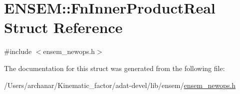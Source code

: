 \hypertarget{structENSEM_1_1FnInnerProductReal}{}\section{E\+N\+S\+EM\+:\+:Fn\+Inner\+Product\+Real Struct Reference}
\label{structENSEM_1_1FnInnerProductReal}


{\ttfamily \#include $<$ensem\+\_\+newops.\+h$>$}



The documentation for this struct was generated from the following file\+:\begin{DoxyCompactItemize}
\item 
/\+Users/archanar/\+Kinematic\+\_\+factor/adat-\/devel/lib/ensem/\mbox{\hyperlink{adat-devel_2lib_2ensem_2ensem__newops_8h}{ensem\+\_\+newops.\+h}}\end{DoxyCompactItemize}
